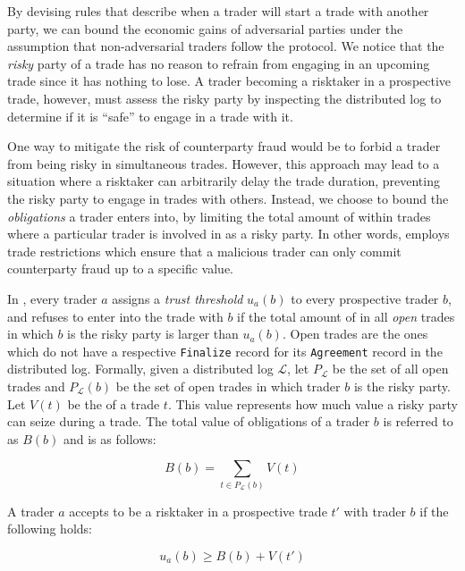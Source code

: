 By devising rules that describe when a trader will start a trade with another party, we can bound the economic gains of adversarial parties under the assumption that non-adversarial traders follow the protocol.
We notice that the \emph{risky} party of a trade has no reason to refrain from engaging in an upcoming trade since it has nothing to lose.
A trader becoming a risktaker in a prospective trade, however, must assess the risky party by inspecting the distributed log to determine if it is \enquote{safe} to engage in a trade with it.

One way to mitigate the risk of counterparty fraud would be to forbid a trader from being risky in simultaneous trades.
However, this approach may lead to a situation where a risktaker can arbitrarily delay the trade duration, preventing the risky party to engage in trades with others.
Instead, we choose to bound the \emph{obligations} a trader enters into, by limiting the total amount of \MarginalStake{} within trades where a particular trader is involved in as a risky party.
In other words, \ModelName{} employs trade restrictions which ensure that a malicious trader can only commit counterparty fraud up to a specific value.

In \ModelName{}, every trader $ a $ assigns a \emph{trust threshold} $ u_a(b) $ to every prospective trader $ b $, and refuses to enter into the trade with $ b $ if the total amount of \MarginalStake{} in all \emph{open} trades in which $ b $ is the risky party is larger than $ u_a(b) $. 
Open trades are the ones which do not have a respective \texttt{Finalize} record for its \texttt{Agreement} record in the distributed log.
Formally, given a distributed log $ \mathcal{L} $, let $ P_{\mathcal{L}} $ be the set of all open trades and $ P_{\mathcal{L}}(b) $ be the set of open trades in which trader $ b $ is the risky party. Let $ V(t) $ be the \MarginalStake{} of a trade $ t $.
This value represents how much value a risky party can seize during a trade.
The total value of obligations of a trader $ b $ is referred to as $ B(b) $ and is as follows:

\begin{equation}\label{key}
	B(b) = \sum_{t \in P_{\mathcal{L}}(b)} V(t)
\end{equation}

A trader $ a $ accepts to be a risktaker in a prospective trade $ t' $ with trader $ b $ if the following holds:

\begin{equation}\label{key}
	u_a(b) \geq B(b) + V(t')
\end{equation}

